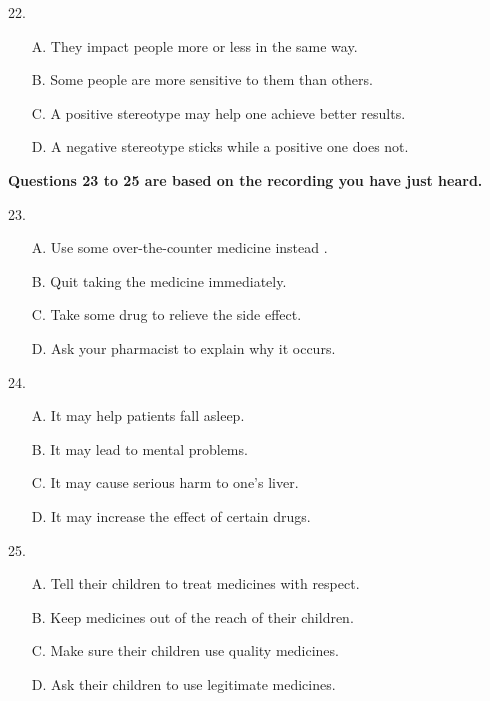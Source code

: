 \documentclass[UTF8,11pt]{ctexart}
\begin{document}
22.


\begin{itemize}[leftmargin=2em,itemsep=.2em,topsep=.4em]\item[A.] They impact people more or less in the same way.
\item[B.] Some people are more sensitive to them than others.
\item[C.] A positive stereotype may help one achieve better results.
\item[D.] A negative stereotype sticks while a positive one does not.
\end{itemize}

\textbf{Questions 23 to 25 are based on the recording you have just heard.}


23.


\begin{itemize}[leftmargin=2em,itemsep=.2em,topsep=.4em]\item[A.] Use some over-the-counter medicine instead .
\item[B.] Quit taking the medicine immediately.
\item[C.] Take some drug to relieve the side effect.
\item[D.] Ask your pharmacist to explain why it occurs.
\end{itemize}

24.


\begin{itemize}[leftmargin=2em,itemsep=.2em,topsep=.4em]\item[A.] It may help patients fall asleep.
\item[B.] It may lead to mental problems.
\item[C.] It may cause serious harm to one’s liver.
\item[D.] It may increase the effect of certain drugs.
\end{itemize}

25.


\begin{itemize}[leftmargin=2em,itemsep=.2em,topsep=.4em]\item[A.] Tell their children to treat medicines with respect.
\item[B.] Keep medicines out of the reach of their children.
\item[C.] Make sure their children use quality medicines.
\item[D.] Ask their children to use legitimate medicines.
\end{itemize}
\end{document}
